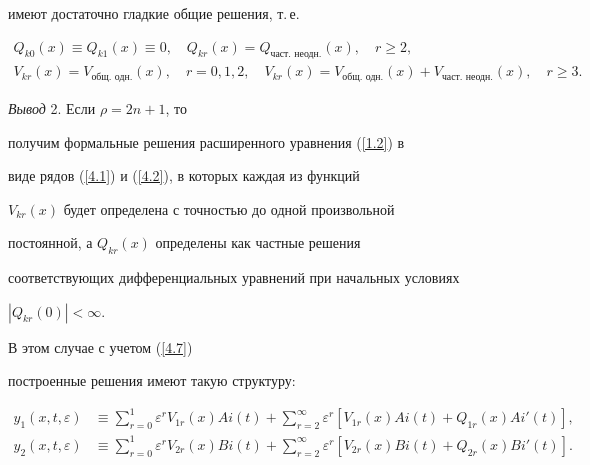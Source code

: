 имеют достаточно гладкие общие решения, т.\,е.


\begin{equation}


\label{4.7}\begin{array}{c}


Q_{k0} (x) \equiv Q_{k1} (x) \equiv0, \quad Q_{kr} (x) =


Q_{\text{част. неодн.}} (x), \quad r\geq 2,\\[2mm]


%


V_{kr} (x) = V_{\text{общ. одн.}} (x), \quad


r = 0,1,2, \quad V_{kr} (x) = V_{\text{общ. одн.}} (x) +


V_{\text{част. неодн.}} (x), \quad r\geq 3. 


\end{array}


\end{equation}





{\it Вывод} 2. Если $\rho = 2n + 1 $, то


получим формальные решения расширенного уравнения (\ref{1.2}) в


виде рядов (\ref{4.1}) и (\ref{4.2}), в которых каждая из функций


$ V_{kr} (x)$ будет определена с точностью до одной произвольной


постоянной, а $ Q_{kr} (x)$ определены как частные решения


соответствующих дифференциальных уравнений при начальных условиях


$|Q_{kr} (0)|< \infty$.


\medskip





В этом случае с учетом (\ref{4.7})


построенные решения имеют такую структуру:


\begin{equation}


\label{4.8}


\begin{split}


y_{1} (x, t, \varepsilon) &\equiv \sum_{r =


0}^{1} \varepsilon^r V_{1 r}(x) Ai (t) +


\sum_{r = 2}^{\infty} \varepsilon^r [V_{1 r}(x)


Ai (t) + Q_{1 r}(x) Ai' (t)],\\


%


y_{2} (x, t, \varepsilon) &\equiv \sum_{r =


 0}^{1} \varepsilon^r V_{2 r}(x) Bi (t) +


\sum_{r = 2}^{\infty} \varepsilon^r [V_{2


r}(x) Bi (t) + Q_{2 r}(x) B i' (t) ] .


\end{split}


\end{equation}





